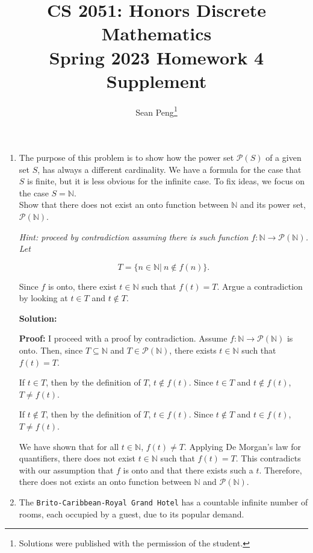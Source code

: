 \documentclass{article}
\title{\vspace{-1cm}CS 2051: Honors Discrete Mathematics \\Spring 2023 Homework 4 Supplement}
\author{Sean Peng\footnote{Solutions were published with the permission of the student.}}
\date{}
\newenvironment{solution}
{
\medskip
\par
\color{blue}
\textbf{Solution:}
}
{
\medskip
\par
}
\begin{document}
\maketitle
\begin{enumerate}

\item The purpose of this problem is to show how the power set $\mathcal{P}(S)$ of a given set $S$, has always a different cardinality. We have a formula for the case that $S$ is finite, but it is less obvious for the infinite case. To fix ideas, we focus on the case $S=\mathbb{N}$.\\

Show that there does not exist an onto function between $\mathbb{N}$ and its power set, $\mathcal{P}(\mathbb{N})$.\\

 {\it Hint: proceed by contradiction assuming there is such function $f:\mathbb{N} \rightarrow \mathcal{P}(\mathbb{N})$. Let 
 
 \[
 T=\{n\in \mathbb{N}|~n\notin f(n) \}.
 \]

Since $f$ is onto, there exist $t\in \mathbb{N}$ such that $f(t)=T$. Argue a contradiction by looking at $t\in T$ and $t\notin T$.}
\begin{solution}

    \textbf{Proof:} I proceed with a proof by contradiction. Assume $f:\mathbb{N} \rightarrow \mathcal{P}(\mathbb{N})$ is onto. Then, since $T \subseteq \mathbb{N}$ and $T \in \mathcal{P}(\mathbb{N})$, there exists $t \in \mathbb{N}$ such that $f(t)=T$.
    
    If $t \in T$, then by the definition of $T$, $t \notin f(t)$. Since $t \in T$ and $t \notin f(t)$, $T \neq f(t)$.

    If $t \notin T$, then by the definition of $T$, $t \in f(t)$. Since $t \notin T$ and $t \in f(t)$, $T \neq f(t)$.

    We have shown that for all $t \in \mathbb{N}$, $f(t) \neq T$. Applying De Morgan's law for quantifiers, there does not exist $t \in \mathbb{N}$ such that $f(t)=T$. This contradicts with our assumption that $f$ is onto and that there exists such a $t$. Therefore, there does not exists an onto function between $\mathbb{N}$ and $\mathcal{P}(\mathbb{N})$.
\end{solution}

\item The {\tt Brito-Caribbean-Royal Grand Hotel} has a countable infinite number of rooms, each occupied by a guest, due to its popular demand.


\end{enumerate}
\end{document}
